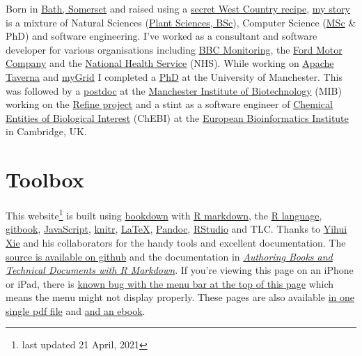 \documentclass[
  12pt,
]{book}
\begin{document}
Born in \href{https://en.wikipedia.org/wiki/Bath,_Somerset}{Bath, Somerset} and raised using a \href{https://en.wikipedia.org/wiki/West_Country}{secret West Country recipe}, \href{https://uk.linkedin.com/in/duncanhull}{my story} is a mixture of Natural Sciences (\href{https://speakerdeck.com/dullhunk/why-study-plants}{Plant Sciences, BSc}), Computer Science (\href{http://www.cs.man.ac.uk/~hulld/msc2003.html}{MSc} \& PhD) and software engineering. I've worked as a consultant and software developer for various organisations including \href{https://en.wikipedia.org/wiki/BBC_Monitoring}{BBC Monitoring}, the \href{https://en.wikipedia.org/wiki/Ford_Motor_Company}{Ford Motor Company} and the \href{https://en.wikipedia.org/wiki/National_Health_Service}{National Health Service} (NHS). While working on \href{https://en.wikipedia.org/wiki/Apache_Taverna}{Apache Taverna} and \href{https://en.wikipedia.org/wiki/MyGrid}{myGrid} I completed a \href{https://ethos.bl.uk/OrderDetails.do?uin=uk.bl.ethos.497578}{PhD} at the University of Manchester. This was followed by a \href{https://en.wikipedia.org/wiki/Postdoctoral_researcher}{postdoc} at the \href{https://www.mib.manchester.ac.uk/}{Manchester Institute of Biotechnology} (MIB) working on the \href{http://www.nactem.ac.uk/pathtext/}{Refine project} and a stint as a software engineer of \href{https://en.wikipedia.org/wiki/ChEBI}{Chemical Entities of Biological Interest} (ChEBI) at the \href{https://en.wikipedia.org/wiki/European_Bioinformatics_Institute}{European Bioinformatics Institute} in Cambridge, UK. 🧬🇪🇺

\hypertarget{toolbox}{%
\section*{Toolbox}\label{toolbox}}

This website\footnote{last updated 21 April, 2021} is built using \href{https://bookdown.org}{bookdown} with \href{https://rmarkdown.rstudio.com/}{R markdown}, the \href{https://en.wikipedia.org/wiki/R_(programming_language)}{R language}, \href{https://www.gitbook.com}{gitbook}, \href{https://en.wikipedia.org/wiki/JavaScript}{JavaScript}, \href{https://en.wikipedia.org/wiki/Knitr}{knitr}, \href{https://en.wikipedia.org/wiki/LaTeX}{LaTeX}, \href{https://pandoc.org/}{Pandoc}, \href{https://rstudio.com/}{RStudio} and TLC. Thanks to \href{https://yihui.org}{Yihui Xie} and his collaborators for the handy tools and excellent documentation. The \href{https://github.com/dullhunk/hulled}{source is available on github} and the documentation in \emph{\href{https://bookdown.org/yihui/bookdown/}{Authoring Books and Technical Documents with R Markdown}}. If you're viewing this page on an iPhone or iPad, there is \href{https://github.com/rstudio/bookdown/issues/60}{known bug with the menu bar at the top of this page} which means the menu might not display properly. These pages are also available \href{http://www.cs.man.ac.uk/~hulld/duncan-hull.pdf}{in one single pdf file} and \href{http://www.cs.man.ac.uk/~hulld/duncan-hull.epub}{and an ebook}.
\end{document}
